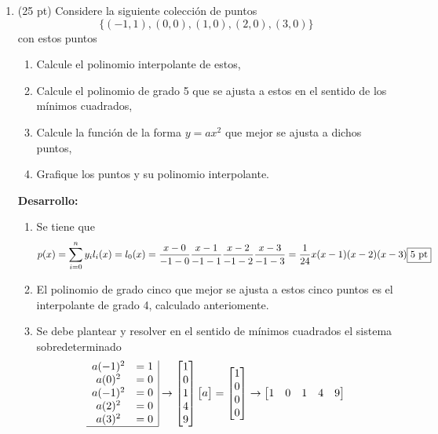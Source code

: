 \documentclass[11pt]{article}
\begin{document}
\begin{enumerate}
\item (25 pt) Considere la siguiente colecci\'on de puntos
$$
\{(-1,1),(0,0),(1,0),(2,0),(3,0)\}
$$
con estos puntos 
\begin{enumerate}
	\item Calcule el polinomio interpolante de estos,
    \item Calcule el polinomio de grado 5 que se ajusta a estos en el sentido de los m\'inimos cuadrados,
    \item Calcule la funci\'on de la forma $y=ax^2$ que mejor se ajusta a dichos puntos,
    \item Grafique los puntos y su polinomio interpolante.
\end{enumerate}
\textbf{Desarrollo:}
\begin{enumerate}
	\item Se tiene que
    $$
    p(x) = \sum_{i=0}^n y_i l_i(x) = l_0(x) 
    	 = \frac{x-0}{-1-0}\frac{x-1}{-1-1}\frac{x-2}{-1-2}\frac{x-3}{-1-3} =\frac{1}{24}x(x-1)(x-2)(x-3)\fbox{5 pt}
    $$
	\item El polinomio de grado cinco que mejor se ajusta a estos cinco puntos es el interpolante de grado 4, calculado anteriomente.    \fbox{5 pt}
    \item Se debe plantear y resolver en el sentido de m\'inimos cuadrados el sistema sobredeterminado
    $$
    \begin{array}{cc|}
    a(-1)^2 & =1\\
    a(0)^2 & =0\\
    a(-1)^2 & =0\\
    a(2)^2 & =0\\
    a(3)^2 & =0\\
    \hline
    \end{array}
    \rightarrow
    \begin{bmatrix}
    1\\0 \\ 1 \\4\\9
    \end{bmatrix}
    \begin{bmatrix}a\end{bmatrix}=
    \begin{bmatrix}
    1 \\ 0 \\ 0 \\ 0
    \end{bmatrix}
    \rightarrow 
    \begin{bmatrix}
    1 & 0 & 1 & 4 & 9

\end{bmatrix}$$
\end{enumerate}
\end{enumerate}
\end{document}

